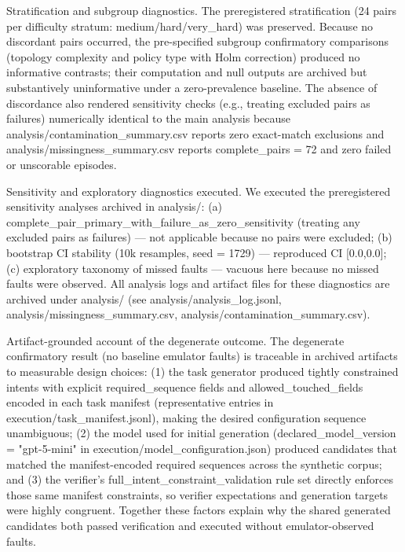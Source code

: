 \documentclass[conference]{IEEEtran}
\begin{document}
Stratification and subgroup diagnostics. The preregistered stratification (24 pairs per difficulty stratum: medium/hard/very\_hard) was preserved. Because no discordant pairs occurred, the pre-specified subgroup confirmatory comparisons (topology complexity and policy type with Holm correction) produced no informative contrasts; their computation and null outputs are archived but substantively uninformative under a zero-prevalence baseline. The absence of discordance also rendered sensitivity checks (e.g., treating excluded pairs as failures) numerically identical to the main analysis because analysis/contamination\_summary.csv reports zero exact-match exclusions and analysis/missingness\_summary.csv reports complete\_pairs = 72 and zero failed or unscorable episodes.

Sensitivity and exploratory diagnostics executed. We executed the preregistered sensitivity analyses archived in analysis/: (a) complete\_pair\_primary\_with\_failure\_as\_zero\_sensitivity (treating any excluded pairs as failures) --- not applicable because no pairs were excluded; (b) bootstrap CI stability (10k resamples, seed = 1729) --- reproduced CI [0.0,0.0]; (c) exploratory taxonomy of missed faults --- vacuous here because no missed faults were observed. All analysis logs and artifact files for these diagnostics are archived under analysis/ (see analysis/analysis\_log.jsonl, analysis/missingness\_summary.csv, analysis/contamination\_summary.csv).

Artifact-grounded account of the degenerate outcome. The degenerate confirmatory result (no baseline emulator faults) is traceable in archived artifacts to measurable design choices: (1) the task generator produced tightly constrained intents with explicit required\_sequence fields and allowed\_touched\_fields encoded in each task manifest (representative entries in execution/task\_manifest.jsonl), making the desired configuration sequence unambiguous; (2) the model used for initial generation (declared\_model\_version = "gpt-5-mini" in execution/model\_configuration.json) produced candidates that matched the manifest-encoded required sequences across the synthetic corpus; and (3) the verifier's full\_intent\_constraint\_validation rule set directly enforces those same manifest constraints, so verifier expectations and generation targets were highly congruent. Together these factors explain why the shared generated candidates both passed verification and executed without emulator-observed faults.
\end{document}

